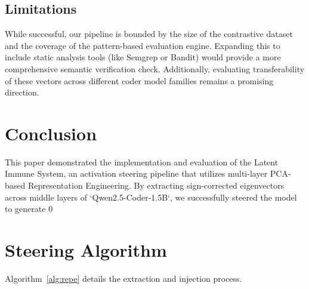 \documentclass[journal, onecolumn]{IEEEtran}
\begin{document}
\subsection{Limitations}
While successful, our pipeline is bounded by the size of the contrastive dataset and the coverage of the pattern-based evaluation engine. Expanding this to include static analysis tools (like Semgrep or Bandit) would provide a more comprehensive semantic verification check. Additionally, evaluating transferability of these vectors across different coder model families remains a promising direction.

\section{Conclusion}
\label{sec:conclusion}

This paper demonstrated the implementation and evaluation of the Latent Immune System, an activation steering pipeline that utilizes multi-layer PCA-based Representation Engineering. By extracting sign-corrected eigenvectors across middle layers of `Qwen2.5-Coder-1.5B`, we successfully steered the model to generate 0%

\appendices

\section{Steering Algorithm}
\label{app:algorithm}
Algorithm~\ref{alg:repe} details the extraction and injection process.
\end{document}
